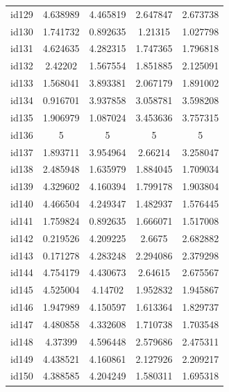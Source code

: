 \documentclass[entropy,article,submit,moreauthors,LaTeX and dvi2pdf]{Definitions/mdpi}
\begin{document}
\begin{center}
\begin{longtable}{ccccc}
id129     & 4.638989  & 4.465819       & 2.647847          & 2.673738          \\
id130     & 1.741732  & 0.892635       & 1.21315           & 1.027798          \\
id131     & 4.624635  & 4.282315       & 1.747365          & 1.796818          \\
id132     & 2.42202   & 1.567554       & 1.851885          & 2.125091          \\
id133     & 1.568041  & 3.893381       & 2.067179          & 1.891002          \\
id134     & 0.916701  & 3.937858       & 3.058781          & 3.598208          \\
id135     & 1.906979  & 1.087024       & 3.453636          & 3.757315          \\
id136     & 5         & 5              & 5                 & 5                 \\
id137     & 1.893711  & 3.954964       & 2.66214           & 3.258047          \\
id138     & 2.485948  & 1.635979       & 1.884045          & 1.709034          \\
id139     & 4.329602  & 4.160394       & 1.799178          & 1.903804          \\
id140     & 4.466504  & 4.249347       & 1.482937          & 1.576445          \\
id141     & 1.759824  & 0.892635       & 1.666071          & 1.517008          \\
id142     & 0.219526  & 4.209225       & 2.6675            & 2.682882          \\
id143     & 0.171278  & 4.283248       & 2.294086          & 2.379298          \\
id144     & 4.754179  & 4.430673       & 2.64615           & 2.675567          \\
id145     & 4.525004  & 4.14702        & 1.952832          & 1.945867          \\
id146     & 1.947989  & 4.150597       & 1.613364          & 1.829737          \\
id147     & 4.480858  & 4.332608       & 1.710738          & 1.703548          \\
id148     & 4.37399   & 4.596448       & 2.579686          & 2.475311          \\
id149     & 4.438521  & 4.160861       & 2.127926          & 2.209217          \\
id150     & 4.388585  & 4.204249       & 1.580311          & 1.695318          \\

\end{longtable}
\end{center}
\end{document}
